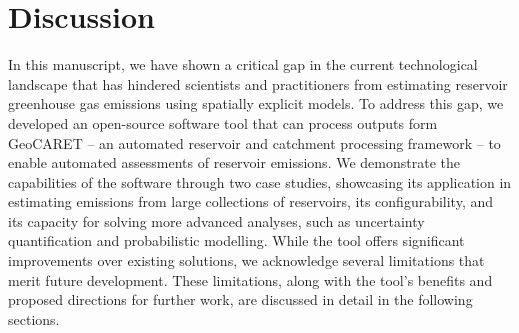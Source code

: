 \documentclass[final,1p,times]{elsarticle}
\begin{document}


\section{Discussion}
\label{sec:discussion}

In this manuscript, we have shown a critical gap in the current technological landscape that has hindered scientists and practitioners from estimating reservoir greenhouse gas emissions using spatially explicit models. 
To address this gap, we developed an open-source software tool that can process outputs form GeoCARET -- an automated reservoir and catchment processing framework -- to enable automated assessments of reservoir emissions.
We demonstrate the capabilities of the software through two case studies, showcasing its application in estimating emissions from large collections of reservoirs, its configurability, and its capacity for solving more advanced analyses, such as uncertainty quantification and probabilistic modelling.
While the tool offers significant improvements over existing solutions, we acknowledge several limitations that merit future development. 
These limitations, along with the tool's benefits and proposed directions for further work, are discussed in detail in the following sections.
\end{document}
